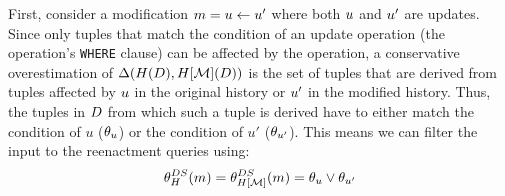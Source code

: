 First, consider a modification $m = u \gets u'$ where both $u$ and $u'$ are updates.
Since only tuples that match the condition of an update operation (the operation's \lstinline!WHERE! clause) can be affected by the operation, a conservative overestimation of $\Delta(H(D),H[\mathcal{M}](D))$ is the set of tuples that are derived from tuples affected by $u$ in the original history or $u'$ in the modified history.
Thus, the tuples in $D$ from which such a tuple is derived have to either match the condition of $u$ ($\theta_{u}$) or the condition of $u'$ ($\theta_{u'}$). This means we can filter the input to the reenactment queries using:
%
\begin{align}
\theta_{H}^{DS}(m) = \theta_{H[\mathcal{M}]}^{DS}(m) = \theta_{u} \vee \theta_{u'} \label{eq:update-ds-cond}
\end{align}
%

